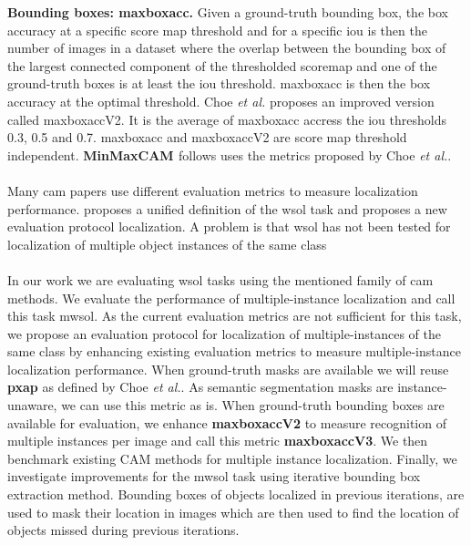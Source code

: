 \textbf{Bounding boxes: \acrshort{maxboxacc}.} Given a ground-truth bounding box, the box accuracy at a specific score map threshold and for a specific \acrshort{iou} is then the number of images in a dataset where the overlap  between the bounding box of the largest connected component of the thresholded scoremap and one of the ground-truth boxes is at least the \acrshort{iou} threshold. \acrshort{maxboxacc} is then the box accuracy at the optimal threshold. Choe \textit{et al.} proposes an improved version called \acrshort{maxboxacc}V2. It is the average of \acrshort{maxboxacc} accress the \acrshort{iou} thresholds 0.3, 0.5 and 0.7. \acrshort{maxboxacc} and \acrshort{maxboxacc}V2 are score map threshold independent. \textbf{MinMaxCAM \cite{wang2021minmaxcam}} follows uses the metrics proposed by Choe \textit{et al.}.
\\\\
Many \acrshort{cam} papers use different evaluation metrics to measure localization performance. \cite{choe2020evaluating} proposes a unified definition of the \acrshort{wsol} task and proposes a new evaluation protocol localization. A problem is that \acrshort{wsol} has not been tested for localization of multiple object instances of the same class
\\\\
In our work we are evaluating \acrshort{wsol} tasks using the mentioned family of \acrshort{cam} methods. We evaluate the performance of multiple-instance localization and call this task \acrfull{mwsol}. As the current evaluation metrics are not sufficient for this task, we propose an evaluation protocol for localization of multiple-instances of the same class by enhancing existing evaluation metrics \cite{choe2020evaluating} to measure multiple-instance localization performance. When ground-truth masks are available we will reuse \textbf{\acrshort{pxap}} as defined by Choe \textit{et al.}. As semantic segmentation masks are instance-unaware, we can use this metric as is. When ground-truth bounding boxes are available for evaluation, we enhance \textbf{\acrshort{maxboxacc}V2} to measure recognition of multiple instances per image and call this metric \textbf{\acrshort{maxboxacc}V3}. We then benchmark existing CAM methods for multiple instance localization. Finally, we investigate improvements for the \acrshort{mwsol} task using iterative bounding box extraction method. Bounding boxes of objects localized in previous iterations, are used to mask their location in images which are then used to find the location of objects missed during previous iterations.